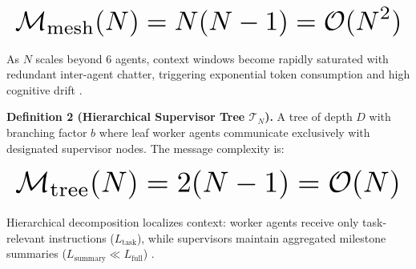 \documentclass{article}
\begin{document}
\begin{equation}
\resizebox{\columnwidth}{!}{$\displaystyle
\begin{aligned}
\mathcal{M}_{\text{mesh}}(N) = N(N - 1) = \mathcal{O}(N^2)
\end{aligned}
$}
\end{equation}






















As $N$ scales beyond 6 agents, context windows become rapidly saturated with redundant inter-agent chatter, triggering exponential token consumption and high cognitive drift \cite{arxiv_2412_06333}.

\textbf{Definition 2 (Hierarchical Supervisor Tree $\mathcal{T}_N$).} A tree of depth $D$ with branching factor $b$ where leaf worker agents communicate exclusively with designated supervisor nodes. The message complexity is:






















\begin{equation}
\resizebox{\columnwidth}{!}{$\displaystyle
\begin{aligned}
\mathcal{M}_{\text{tree}}(N) = 2(N - 1) = \mathcal{O}(N)
\end{aligned}
$}
\end{equation}






















Hierarchical decomposition localizes context: worker agents receive only task-relevant instructions ($L_{\text{task}}$), while supervisors maintain aggregated milestone summaries ($L_{\text{summary}} \ll L_{\text{full}}$) \cite{arxiv_2406_00584}.
\end{document}
